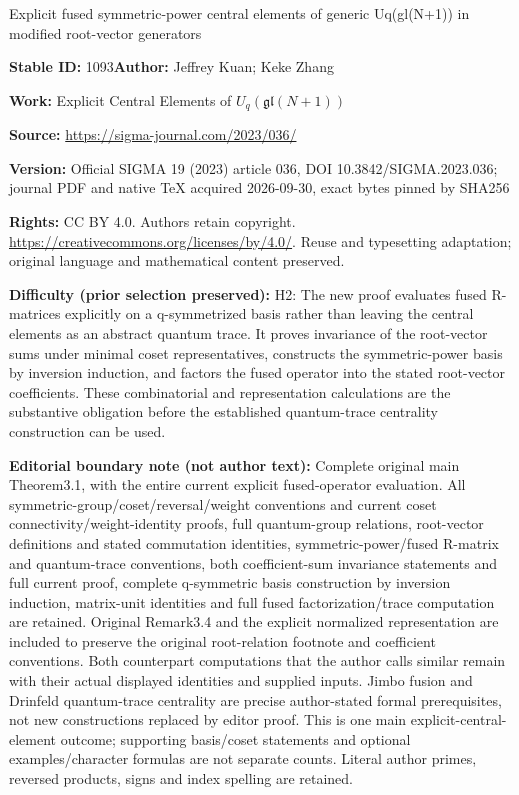 \documentclass[11pt]{article}
\numberwithin{equation}{section}
\numberwithin{equation}{section}
\begin{document}
\begin{center}\Large Explicit fused symmetric-power central elements of generic Uq(gl(N+1)) in modified root-vector generators\end{center}
\noindent\textbf{Stable ID:} 1093\quad\textbf{Author:} Jeffrey Kuan; Keke Zhang\par
\noindent\textbf{Work:} Explicit Central Elements of $U_q(\mathfrak{gl}(N+1))$\par
\noindent\textbf{Source:} \url{https://sigma-journal.com/2023/036/}\par
\noindent\textbf{Version:} Official SIGMA 19 (2023) article 036, DOI 10.3842/SIGMA.2023.036; journal PDF and native TeX acquired 2026-09-30, exact bytes pinned by SHA256\par
\noindent\textbf{Rights:} CC BY 4.0. Authors retain copyright. \url{https://creativecommons.org/licenses/by/4.0/}. Reuse and typesetting adaptation; original language and mathematical content preserved.\par
\noindent\textbf{Difficulty (prior selection preserved):} {\CJKfont H2: The new proof evaluates fused R-matrices explicitly on a q-symmetrized basis rather than leaving the central elements as an abstract quantum trace. It proves invariance of the root-vector sums under minimal coset representatives, constructs the symmetric-power basis by inversion induction, and factors the fused operator into the stated root-vector coefficients. These combinatorial and representation calculations are the substantive obligation before the established quantum-trace centrality construction can be used.}\par
\medskip\noindent\textbf{Editorial boundary note (not author text):} Complete original main Theorem3.1, with the entire current explicit fused-operator evaluation. All symmetric-group/coset/reversal/weight conventions and current coset connectivity/weight-identity proofs, full quantum-group relations, root-vector definitions and stated commutation identities, symmetric-power/fused R-matrix and quantum-trace conventions, both coefficient-sum invariance statements and full current proof, complete q-symmetric basis construction by inversion induction, matrix-unit identities and full fused factorization/trace computation are retained. Original Remark3.4 and the explicit normalized representation are included to preserve the original root-relation footnote and coefficient conventions. Both counterpart computations that the author calls similar remain with their actual displayed identities and supplied inputs. Jimbo fusion and Drinfeld quantum-trace centrality are precise author-stated formal prerequisites, not new constructions replaced by editor proof. This is one main explicit-central-element outcome; supporting basis/coset statements and optional examples/character formulas are not separate counts. Literal author primes, reversed products, signs and index spelling are retained.\par
\end{document}
